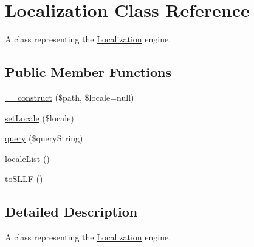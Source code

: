 \hypertarget{class_simple_lion_1_1_localization}{\section{Localization Class Reference}
\label{class_simple_lion_1_1_localization}
}


A class representing the \hyperlink{class_simple_lion_1_1_localization}{Localization} engine.  


\subsection*{Public Member Functions}
\begin{DoxyCompactItemize}
\item 
\hyperlink{class_simple_lion_1_1_localization_aff9c6ae8a009c4a2c42523c416af6f21}{\-\_\-\-\_\-construct} (\$path, \$locale=null)
\item 
\hyperlink{class_simple_lion_1_1_localization_a1bef7c51e9f6a97840f016a8f0a615ae}{set\-Locale} (\$locale)
\item 
\hyperlink{class_simple_lion_1_1_localization_abb5a777a3f4217d9473883e80cae4b53}{query} (\$query\-String)
\item 
\hyperlink{class_simple_lion_1_1_localization_a357800ef35be75a58766fdb86090211b}{locale\-List} ()
\item 
\hyperlink{class_simple_lion_1_1_localization_a129b22867863a1b34ffd83448a8546bd}{to\-S\-L\-L\-F} ()
\end{DoxyCompactItemize}


\subsection{Detailed Description}
A class representing the \hyperlink{class_simple_lion_1_1_localization}{Localization} engine. 

